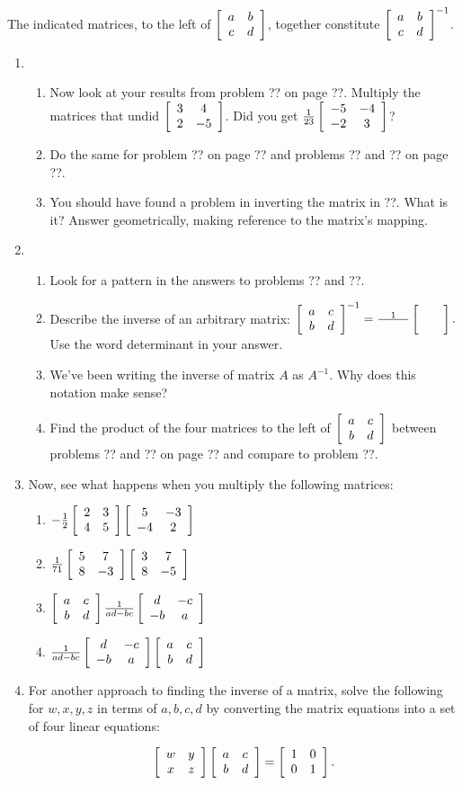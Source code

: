 \documentclass[../gatm.tex]{subfiles}
\begin{document}
The indicated matrices, to the left of $\left[\begin{array}{cc} a & b \\ c & d \end{array}\right]$, together constitute $\left[\begin{array}{cc} a & b \\ c & d \end{array}\right]^{-1}$.

\begin{enumerate}
\item \begin{enumerate}
\item Now look at your results from problem ?? on page ??. Multiply the matrices that undid $\left[\begin{array}{cc} 3 & 4 \\ 2 & -5 \end{array}\right]$. Did you get $\frac{1}{23}\left[\begin{array}{cc} -5 & -4 \\ -2 & 3 \end{array}\right]$?
\item Do the same for problem ?? on page ?? and problems ?? and ?? on page ??.
\item You should have found a problem in inverting the matrix in ??. What is it? Answer geometrically, making reference to the matrix's mapping.
\end{enumerate}
\item \begin{enumerate}
\item Look for a pattern in the answers to problems ?? and ??.
\item Describe the inverse of an arbitrary matrix: $\left[\begin{array}{cc} a & c \\ b & d \end{array}\right]^{-1}=\frac{1}{\phantom{000000}}\left[\begin{array}{cc}  &  \\  &  \end{array}\right].$ Use the word determinant in your answer.
\item We've been writing the inverse of matrix $A$ as $A^{-1}$. Why does this notation make sense?
\item Find the product of the four matrices to the left of $\left[\begin{array}{cc} a & c \\ b & d \end{array}\right]$ between problems ?? and ?? on page ?? and compare to problem ??.
\end{enumerate}
\item Now, see what happens when you multiply the following matrices:
\begin{multicols}{2}
\begin{enumerate}
\item $-\frac{1}{2}\left[\begin{array}{cc} 2 & 3 \\ 4 & 5 \end{array}\right]\left[\begin{array}{cc} 5 & -3 \\ -4 & 2 \end{array}\right]$
\item $\frac{1}{71}\left[\begin{array}{cc} 5 & 7 \\ 8 & -3 \end{array}\right]\left[\begin{array}{cc} 3 & 7 \\ 8 & -5 \end{array}\right]$
\item $\left[\begin{array}{cc} a & c \\ b & d \end{array}\right]\frac{1}{ad-bc}\left[\begin{array}{cc} d & -c \\ -b & a \end{array}\right]$
\item $\frac{1}{ad-bc}\left[\begin{array}{cc} d & -c \\ -b & a \end{array}\right]\left[\begin{array}{cc} a & c \\ b & d \end{array}\right]$
\end{enumerate}
\end{multicols}
\item For another approach to finding the inverse of a matrix, solve the following for $w,x,y,z$ in terms of $a,b,c,d$ by converting the matrix equations into a set of four linear equations:

$$\left[\begin{array}{cc} w & y \\ x & z \end{array}\right]\left[\begin{array}{cc} a & c \\ b & d \end{array}\right]=\left[\begin{array}{cc} 1 & 0 \\ 0 & 1 \end{array}\right].$$
\end{enumerate}
\end{document}
